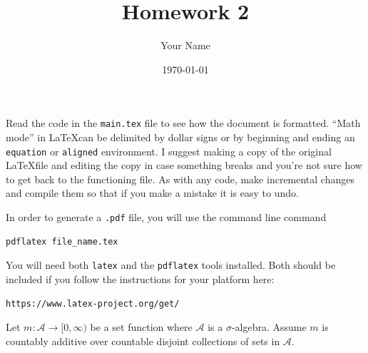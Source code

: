 \documentclass{article}
\title{Homework 2}
\author{Your Name}
\date\today
\begin{document}
\maketitle %

Read the code in the \texttt{main.tex} file to see how the document is formatted. ``Math mode'' in \LaTeX  can be delimited by dollar signs or by beginning and ending an \texttt{equation} or \texttt{aligned} environment. I suggest making a copy of the original \LaTeX file and editing the copy in case something breaks and you're not sure how to get back to the functioning file. As with any code, make incremental changes and compile them so that if you make a mistake it is easy to undo.

In order to generate a \texttt{.pdf} file, you will use the command line command

\begin{verbatim}
pdflatex file_name.tex
\end{verbatim}

You will need both \texttt{latex} and the \texttt{pdflatex} tools installed. Both should be included if you follow the instructions for your platform here:

\begin{verbatim}
https://www.latex-project.org/get/
\end{verbatim}




Let $m:\mathcal{A}\rightarrow [0,\infty)$ be a set function where $\mathcal{A}$ is a $\sigma$-algebra. Assume $m$ is countably additive over countable disjoint collections of sets in $\mathcal{A}$.
\end{document}
